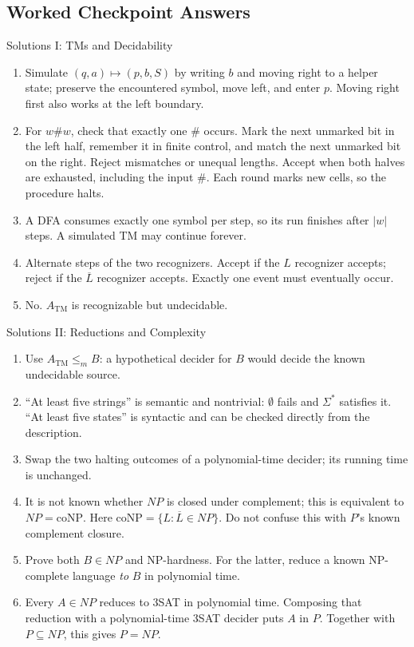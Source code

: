 \documentclass[10pt]{beamer}
\newcommand{\ATM}{A_{\mathrm{TM}}}
\begin{document}
\subsection{Worked Checkpoint Answers}

\begin{frame}{Solutions I: TMs and Decidability}
  \small
  \begin{enumerate}
    \item Simulate $(q,a)\mapsto(p,b,S)$ by writing $b$ and moving right
      to a helper state; preserve the encountered symbol, move left, and
      enter $p$. Moving right first also works at the left boundary.
    \item For $w\#w$, check that exactly one $\#$ occurs. Mark the next
      unmarked bit in the left half, remember it in finite control, and
      match the next unmarked bit on the right. Reject mismatches or
      unequal lengths. Accept when both halves are exhausted, including
      the input $\#$. Each round marks new cells, so the procedure halts.
    \item A DFA consumes exactly one symbol per step, so its run finishes
      after $|w|$ steps. A simulated TM may continue forever.
    \item Alternate steps of the two recognizers. Accept if the $L$
      recognizer accepts; reject if the $\overline L$ recognizer accepts.
      Exactly one event must eventually occur.
    \item No. $\ATM$ is recognizable but undecidable.
  \end{enumerate}
\end{frame}

\begin{frame}{Solutions II: Reductions and Complexity}
  \small
  \begin{enumerate}
    \item Use $\ATM\le_m B$: a hypothetical decider for $B$ would decide
      the known undecidable source.
    \item ``At least five strings'' is semantic and nontrivial:
      $\emptyset$ fails and $\Sigma^*$ satisfies it. ``At least five states''
      is syntactic and can be checked directly from the description.
    \item Swap the two halting outcomes of a polynomial-time decider;
      its running time is unchanged.
    \item It is not known whether $NP$ is closed under complement;
      this is equivalent to $NP=\mathrm{coNP}$. Here
      $\mathrm{coNP}=\{L:\overline L\in NP\}$. Do not confuse this with
      $P$'s known complement closure.
    \item Prove both $B\in NP$ and NP-hardness. For the latter, reduce
      a known NP-complete language \emph{to} $B$ in polynomial time.
    \item Every $A\in NP$ reduces to 3SAT in polynomial time. Composing
      that reduction with a polynomial-time 3SAT decider puts $A$ in $P$.
      Together with $P\subseteq NP$, this gives $P=NP$.
  \end{enumerate}
\end{frame}
\end{document}

